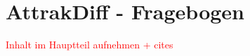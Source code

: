 \section{AttrakDiff - Fragebogen}
\textcolor{red}{Inhalt im Hauptteil aufnehmen + cites} \cite{attrakdiff-2000, attrakdiff-2003, attrakdiff-2008}
